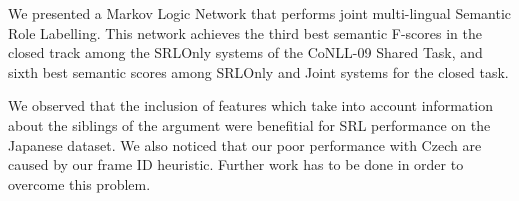 

We presented a Markov Logic Network that performs joint multi-lingual Semantic 
Role Labelling. This network achieves the third best semantic F-scores in the 
closed track among the SRLOnly systems of the CoNLL-09 Shared Task, and sixth 
best semantic scores among SRLOnly and Joint systems for the closed task.

We observed that the inclusion of features which take into account 
information about the siblings of the argument were benefitial for 
SRL performance on the Japanese dataset. We also noticed that our poor performance with Czech 
are caused by our frame ID heuristic. Further work 
has to be done in order to overcome this problem. 
